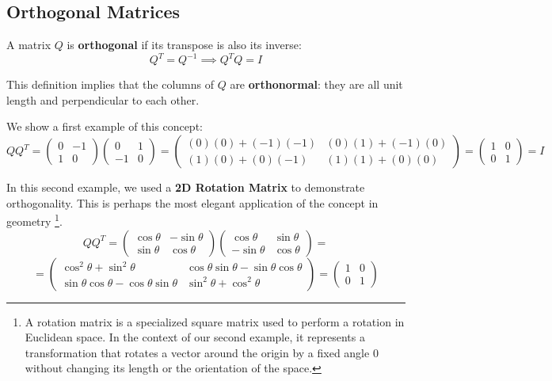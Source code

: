 \subsection{Orthogonal Matrices}

A matrix $Q$ is \textbf{orthogonal} if its transpose is also its inverse:
\[ Q^T = Q^{-1} \implies Q^T Q = I \]

This definition implies that the columns of $Q$ are \textbf{orthonormal}: they are all unit length and perpendicular to each other.

We show a first example of this concept:
$$
Q Q^T =
\begin{pmatrix} 0 & -1 \\ 1 & 0 \end{pmatrix}
\begin{pmatrix} 0 & 1 \\ -1 & 0 \end{pmatrix} =
\begin{pmatrix}
(0)(0) + (-1)(-1) & (0)(1) + (-1)(0) \\
(1)(0) + (0)(-1) & (1)(1) + (0)(0)
\end{pmatrix} =
\begin{pmatrix} 1 & 0 \\ 0 & 1 \end{pmatrix} = I
$$

In this second example, we used a \textbf{2D Rotation Matrix} to demonstrate orthogonality. This is perhaps the most elegant application of the concept in geometry \footnote{A rotation matrix is a specialized square matrix used to perform a rotation in Euclidean space. In the context of our second example, it represents a transformation that rotates a vector around the origin by a fixed angle $0$ without changing its length or the orientation of the space.}.
$$
Q Q^T =
\begin{pmatrix} \cos\theta & -\sin\theta \\ \sin\theta & \cos\theta \end{pmatrix}
\begin{pmatrix} \cos\theta & \sin\theta \\ -\sin\theta & \cos\theta \end{pmatrix} =
$$
$$
= \begin{pmatrix}
\cos^2\theta + \sin^2\theta & \cos\theta\sin\theta - \sin\theta\cos\theta \\
\sin\theta\cos\theta - \cos\theta\sin\theta & \sin^2\theta + \cos^2\theta
\end{pmatrix} =
\begin{pmatrix} 1 & 0 \\ 0 & 1 \end{pmatrix}
$$

